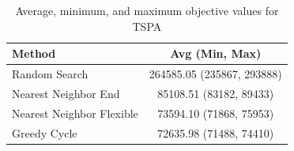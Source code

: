 \begin{table}[h!]
\centering
\begin{tabular}{lc}
\hline
Method & Avg (Min, Max) \\
\hline
Random Search & 264585.05 (235867, 293888) \\
Nearest Neighbor End & 85108.51 (83182, 89433) \\
Nearest Neighbor Flexible & 73594.10 (71868, 75953) \\
Greedy Cycle & 72635.98 (71488, 74410) \\
\hline
\end{tabular}
\caption{Average, minimum, and maximum objective values for TSPA}
\label{tab:TSPA_results}
\end{table}
